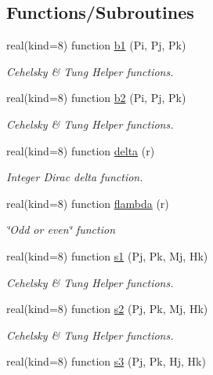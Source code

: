 \subsection*{Functions/\+Subroutines}
\begin{DoxyCompactItemize}
\item 
real(kind=8) function \hyperlink{namespaceinprod__analytic_a65ce3c65ea7e796a09b702d3c0f63fe0}{b1} (Pi, Pj, Pk)
\begin{DoxyCompactList}\small\item\em Cehelsky \& Tung Helper functions. \end{DoxyCompactList}\item 
real(kind=8) function \hyperlink{namespaceinprod__analytic_ac3804db9421130d611b222d8b12c1882}{b2} (Pi, Pj, Pk)
\begin{DoxyCompactList}\small\item\em Cehelsky \& Tung Helper functions. \end{DoxyCompactList}\item 
real(kind=8) function \hyperlink{namespaceinprod__analytic_ac500ef2ae885d78a4f4558392a92fd0c}{delta} (r)
\begin{DoxyCompactList}\small\item\em Integer Dirac delta function. \end{DoxyCompactList}\item 
real(kind=8) function \hyperlink{namespaceinprod__analytic_a7e49045b5dd4cf8d0a4eb096570e8f5c}{flambda} (r)
\begin{DoxyCompactList}\small\item\em \char`\"{}\+Odd or even\char`\"{} function \end{DoxyCompactList}\item 
real(kind=8) function \hyperlink{namespaceinprod__analytic_a90a2b9840d6c77f13aaadd7e0537800c}{s1} (Pj, Pk, Mj, Hk)
\begin{DoxyCompactList}\small\item\em Cehelsky \& Tung Helper functions. \end{DoxyCompactList}\item 
real(kind=8) function \hyperlink{namespaceinprod__analytic_a319a35a215ad426474c9a2beb4d85bbb}{s2} (Pj, Pk, Mj, Hk)
\begin{DoxyCompactList}\small\item\em Cehelsky \& Tung Helper functions. \end{DoxyCompactList}\item 
real(kind=8) function \hyperlink{namespaceinprod__analytic_a671ca8c3aae1db0a453a13e94462baa0}{s3} (Pj, Pk, Hj, Hk)

\end{DoxyCompactItemize}
